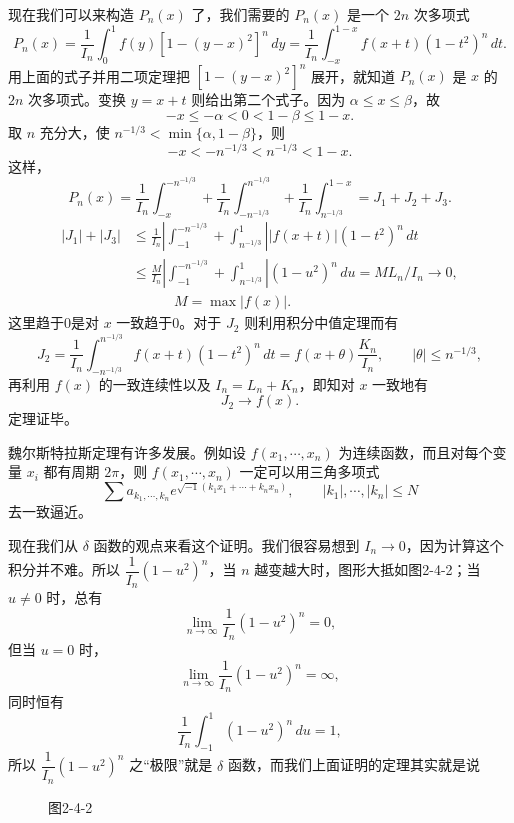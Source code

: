 现在我们可以来构造 $P_n(x)$ 了，我们需要的 $P_n(x)$ 是一个 $2n$ 次多项式
\[
P_n(x)=\frac1{I_n}\int_0^1 f(y)[1-(y-x)^2]^n\,dy
=\frac1{I_n}\int_{-x}^{1-x}f(x+t)(1-t^2)^n\,dt.
\]
用上面的式子并用二项定理把 $[1-(y-x)^2]^n$ 展开，就知道 $P_n(x)$ 是 $x$ 的 $2n$ 次多项式。变换 $y=x+t$ 则给出第二个式子。因为 $\alpha\le x\le\beta$，故
\[
-x\le-\alpha<0<1-\beta\le1-x.
\]
取 $n$ 充分大，使 $n^{-1/3}<\min\{\alpha,1-\beta\}$，则
\[
-x<-n^{-1/3}<n^{-1/3}<1-x.
\]
这样，
\[
P_n(x)=\frac1{I_n}\int_{-x}^{-n^{-1/3}}
+\frac1{I_n}\int_{-n^{-1/3}}^{n^{-1/3}}
+\frac1{I_n}\int_{n^{-1/3}}^{1-x}
=J_1+J_2+J_3.
\]
\[
\begin{aligned}
|J_1|+|J_3|
&\le\frac1{I_n}
\left|\int_{-1}^{-n^{-1/3}}+\int_{n^{-1/3}}^1\right|
|f(x+t)|(1-t^2)^n\,dt\\
&\le\frac{M}{I_n}
\left|\int_{-1}^{-n^{-1/3}}+\int_{n^{-1/3}}^1\right|
(1-u^2)^n\,du
=ML_n/I_n\to0,\\[-1pt]
&\hspace{3em} M=\max|f(x)|.
\end{aligned}
\]
这里趋于0是对 $x$ 一致趋于0。对于 $J_2$ 则利用积分中值定理而有
\[
J_2=\frac1{I_n}\int_{-n^{-1/3}}^{n^{-1/3}}f(x+t)(1-t^2)^n\,dt
=f(x+\theta)\frac{K_n}{I_n},
\qquad |\theta|\le n^{-1/3},
\]
再利用 $f(x)$ 的一致连续性以及 $I_n=L_n+K_n$，即知对 $x$ 一致地有
\[
J_2\to f(x).
\]
定理证毕。

魏尔斯特拉斯定理有许多发展。例如设 $f(x_1,\cdots,x_n)$ 为连续函数，而且对每个变量 $x_i$ 都有周期 $2\pi$，则 $f(x_1,\cdots,x_n)$ 一定可以用三角多项式
\[
\sum a_{k_1,\cdots,k_n}e^{\sqrt{-1}(k_1x_1+\cdots+k_nx_n)},
\qquad |k_1|,\cdots,|k_n|\le N
\]
去一致逼近。

现在我们从 $\delta$ 函数的观点来看这个证明。我们很容易想到 $I_n\to0$，因为计算这个积分并不难。所以 $\dfrac1{I_n}(1-u^2)^n$，当 $n$ 越变越大时，图形大抵如图2-4-2；当 $u\ne0$ 时，总有
\[
\lim_{n\to\infty}\frac1{I_n}(1-u^2)^n=0,
\]
但当 $u=0$ 时，
\[
\lim_{n\to\infty}\frac1{I_n}(1-u^2)^n=\infty,
\]
同时恒有
\[
\frac1{I_n}\int_{-1}^1(1-u^2)^n\,du=1,
\]
所以 $\dfrac1{I_n}(1-u^2)^n$ 之“极限”就是 $\delta$ 函数，而我们上面证明的定理其实就是说

\begin{figure}[htbp]
\centering
{}
\caption*{图2-4-2}
\end{figure}


